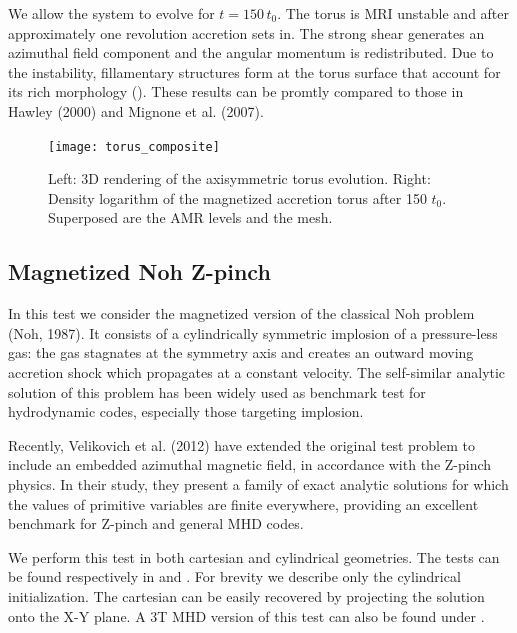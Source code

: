 We allow the system to evolve for $t=150\,t_0$. The torus is MRI unstable and
after approximately one revolution accretion sets in. The strong shear generates
an azimuthal field component and the angular momentum is redistributed. 
Due to the instability, fillamentary structures form at the torus surface
that account for its rich morphology ().
These results can be promtly compared to those in Hawley (2000) and
Mignone et al. (2007).
%
\begin{figure}[!ht]
\begin{center}
\leavevmode\texttt{[image: torus\_composite]}
\end{center}
\caption{\label{Fig:accretiontorus} Left: 3D rendering of the axisymmetric
torus evolution. Right: Density logarithm of the magnetized accretion torus
after 150 $t_0$. Superposed are the AMR levels and the mesh.}
\end{figure}
%

\clearpage
\subsection{Magnetized Noh Z-pinch}
\label{Sec:MagnetizedNoh}

In this test we consider the magnetized version of the classical Noh problem (Noh, 1987).
It consists of a cylindrically symmetric implosion of a pressure-less gas: the gas
stagnates at the symmetry axis and creates an outward moving accretion shock which
propagates at a constant velocity. The self-similar analytic solution of this problem
has been widely used as benchmark test for hydrodynamic codes, especially those targeting
implosion.

Recently, Velikovich et al. (2012) have extended the original test problem to include
an embedded azimuthal magnetic field, in accordance with the Z-pinch physics.
In their study, they present a family of exact analytic solutions for which the
values of primitive variables are finite everywhere, providing an excellent benchmark
for Z-pinch and general MHD codes.

We perform this test in both cartesian and cylindrical geometries. The tests
can be found respectively in  and .
For brevity we describe only the cylindrical initialization. The cartesian can be
easily recovered by projecting the solution onto the X-Y plane. A 3T MHD version of this 
test can also be found under .

